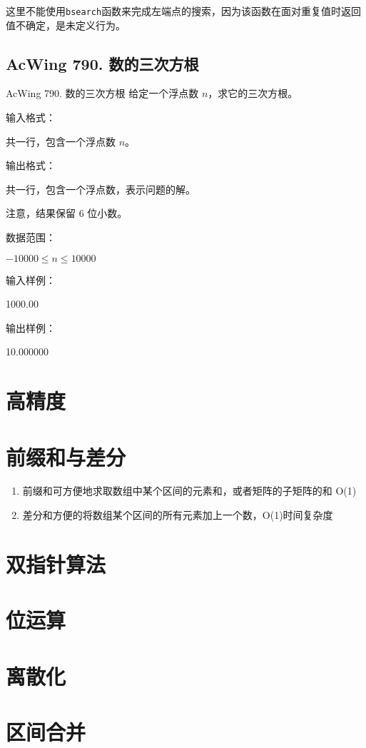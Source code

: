\begin{exclamation}
    这里不能使用\lstinline{bsearch}函数来完成左端点的搜索，因为该函数在面对重复值时返回值不确定，是未定义行为。
\end{exclamation}

\subsection{AcWing 790. 数的三次方根}
\begin{titledbox}{AcWing 790. 数的三次方根}
    给定一个浮点数 $n$，求它的三次方根。

    输入格式：

    共一行，包含一个浮点数 $n$。

    输出格式：

    共一行，包含一个浮点数，表示问题的解。
    
    注意，结果保留 $6$ 位小数。
    
    数据范围：

    $-10000 \le n \le 10000$
    
    输入样例：
    
    1000.00
    
    输出样例：

    10.000000
\end{titledbox}
\section{高精度}

\section{前缀和与差分}
\begin{enumerate}
    \item 前缀和可方便地求取数组中某个区间的元素和，或者矩阵的子矩阵的和 O(1)
    \item 差分和方便的将数组某个区间的所有元素加上一个数，O(1)时间复杂度
\end{enumerate}

\section{双指针算法}


\section{位运算}


\section{离散化}


\section{区间合并}